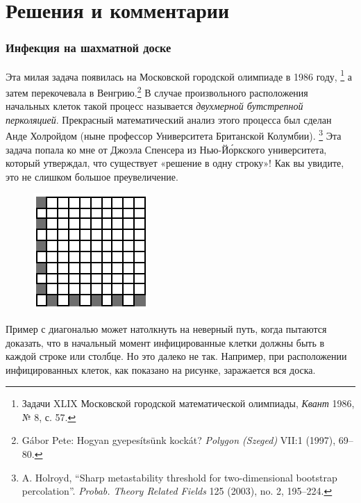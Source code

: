 \section*{Решения и комментарии}

\subsubsection*{Инфекция на шахматной доске}%

{\sloppy

Эта милая задача появилась на Московской городской олимпиаде в 1986 году,%
\footnote{Задачи XLIX Московской городской математической олимпиады, \emph{Квант} 1986, № 8, с. 57.}
а затем перекочевала в Венгрию.\footnote{Gábor Pete: Hogyan gyepesítsünk kockát? \emph{Polygon (Szeged)} VII:1 (1997), 69--80.}
В случае произвольного расположения начальных клеток такой процесс называется \emph{двухмерной бутстрепной перколяцией}.
Прекрасный математический анализ этого процесса был сделан Анде Холройдом (ныне профессор Университета Британской Колумбии).%
\footnote{A. Holroyd, ``Sharp metastability threshold for two-dimensional bootstrap percolation''. \emph{Probab. Theory Related Fields} 125 (2003), no. 2, 195--224.}
Эта задача попала ко мне от Джоэла Спенсера %
из Нью-Й\'{о}ркского университета, который утверждал, что существует «решение в одну строку»!
Как вы увидите, это не слишком большое преувеличение.

}

{

\begin{figure}
\vskip-6mm
\centering
\includegraphics[scale=1.5]{Figs/Algorithms/sick}
\end{figure}

\medskip

Пример с диагональю может натолкнуть на неверный путь, когда пытаются доказать, что в начальный момент инфицированные клетки должны быть в каждой строке или столбце.
Но это далеко не так.
Например, при расположении инфицированных клеток, как показано на рисунке, заражается вся доска.

}


